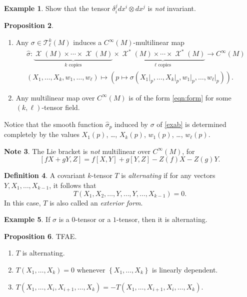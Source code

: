 \documentclass[10pt,letterpaper,cm]{nupset}
\theoremstyle{definition}
\newtheorem{definition}{Definition}[subsection]
\newtheorem{exmp}[definition]{Example}
\newtheorem{note}[definition]{Note}
\theoremstyle{theorem}
\newtheorem{prop}[definition]{Proposition}
\theoremstyle{remark}
\newcommand{\T}{\mathcal T}
\newcommand{\1}{\mathbf{1}}
\newcommand{\0}{\vec 0}
\DeclareMathOperator{\vf}{\mathscr{X}}
\begin{document}
\begin{exmp}
Show that the tensor $\delta_i^j dx^i \otimes dx^j$ is \emph{not} invariant. 
\end{exmp}

\begin{prop} $ $
\begin{enumerate}
\item Any $ \sigma \in \T_{\ell}^k(M)$ induces a $C^{\infty}(M)$-multilinear map 
\begin{gather*}
\hat{\sigma} : \underbrace{\vf(M) \times \cdots \times \vf(M)}_{k \text{ copies}} \times \underbrace{\vf^{\ast}(M) \times \cdots \times \vf^{\ast}(M)}_{\ell \text{ copies}}\longrightarrow C^{\infty}(M)
\label{eqn:form} \\ \left(X_1, \ldots, X_k, w_1, \ldots, w_{\ell}\right)\mapsto \left(p \mapsto \sigma \left(X_1\bigr\rvert_p, \ldots, X_k\bigr\rvert_p, w_1\bigr\rvert_p, \ldots, w_{\ell}\bigr\rvert_p\right)\right). \tag{$\ast$}
\end{gather*}
\item Any multilinear map over $C^{\infty}(M)$ is of the form \eqref{eqn:form} for some $\left(k, \ell\right)$-tensor field.
\end{enumerate}
\end{prop}

Notice that the smooth function $\hat{\sigma}_p$ induced by $\sigma$ of \cref{exab} is determined completely by  the values $X_1(p)$, \ldots, $X_k(p)$, $w_1(p)$, \ldots, $w_{\ell}(p)$.

\medskip

\begin{note}
The Lie bracket is \emph{not} multilinear over $C^{\infty}(M)$, for $$[fX + gY, Z] = f\left[X, Y\right] + g[Y, Z]-Z(f)X -Z(g)Y.$$
\end{note}

\medskip


\begin{definition}
A covariant $k$-tensor $T$ is \textit{alternating}  if for any vectors $Y, X_1, \ldots, X_{k-1}$, it follows that $$T(X_1, X_2, \ldots, Y, \ldots, Y, \ldots, X_{k-1}) =0.$$ In this case, $T$ is also called an \textit{exterior form}.
\end{definition}

\begin{exmp}
If $\sigma$ is a $0$-tensor or a $1$-tensor, then it is alternating.
\end{exmp}

\begin{prop} TFAE.
\begin{enumerate}
\item $T$ is alternating.
\item $T(X_1, \ldots, X_k) =0$ whenever $\left\{X_1, \ldots,  X_k\right\}$ is linearly dependent.
\item $T(X_1, \ldots, X_i, X_{i+1}, \ldots, X_k) = {-T(X_1, \ldots, X_{i+1}, X_{i}, \ldots, X_k)}$.
\end{enumerate}
\end{prop}
\end{document}
